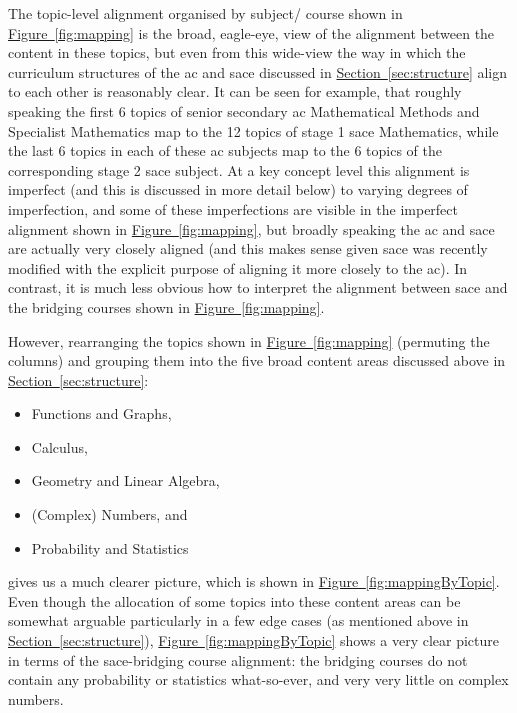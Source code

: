 \documentclass[twoside,12pt,a4paper]{report}
\newcommand{\refsec}[1]{\hyperref[sec:#1]{Section~\ref{sec:#1}}}
\newcommand{\reffig}[1]{\hyperref[fig:#1]{Figure~\ref{fig:#1}}}
\begin{document}
The topic-level alignment organised by subject/ course shown in \reffig{mapping} is the broad, eagle-eye, view of the alignment between the content in these topics, but even from this wide-view the way in which the curriculum structures of the \gls{ac} and \gls{sace} discussed in \refsec{structure} align to each other is reasonably clear. It can be seen for example, that roughly speaking the first 6 topics of senior secondary \gls{ac} Mathematical Methods and Specialist Mathematics map to the 12 topics of stage 1 \gls{sace} Mathematics, while the last 6 topics in each of these \gls{ac} subjects map to the 6 topics of the corresponding stage 2 \gls{sace} subject. At a key concept level this alignment is imperfect (and this is discussed in more detail below) to varying degrees of imperfection, and some of these imperfections are visible in the imperfect alignment shown in \reffig{mapping}, but broadly speaking the \gls{ac} and \gls{sace} are actually very closely aligned (and this makes sense given \gls{sace} was recently modified with the explicit purpose of aligning it more closely to the \gls{ac}). In contrast, it is much less obvious how to interpret the alignment between \gls{sace} and the bridging courses shown in \reffig{mapping}.

However, rearranging the topics shown in \reffig{mapping} (permuting the columns) and grouping them into the five broad content areas discussed above in \refsec{structure}: 
\begin{itemize}
	\item Functions and Graphs, 
	\item Calculus, 
	\item Geometry and Linear Algebra, 
	\item (Complex) Numbers, and 
	\item Probability and Statistics	
\end{itemize}
gives us a much clearer picture, which is shown in \reffig{mappingByTopic}. Even though the allocation of some topics into these content areas can be somewhat arguable particularly in a few edge cases (as mentioned above in \refsec{structure}), \reffig{mappingByTopic} shows a very clear picture in terms of the \gls{sace}-bridging course alignment: the bridging courses do not contain any probability or statistics what-so-ever, and very very little on complex numbers. 
\end{document}
